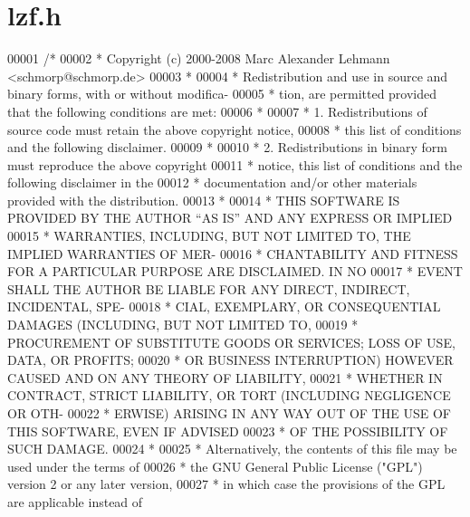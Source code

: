 \hypertarget{lzf_8h_source}{}\section{lzf.\+h}
\label{lzf_8h_source}

\begin{DoxyCode}
00001 \textcolor{comment}{/*}
00002 \textcolor{comment}{ * Copyright (c) 2000-2008 Marc Alexander Lehmann <schmorp@schmorp.de>}
00003 \textcolor{comment}{ *}
00004 \textcolor{comment}{ * Redistribution and use in source and binary forms, with or without modifica-}
00005 \textcolor{comment}{ * tion, are permitted provided that the following conditions are met:}
00006 \textcolor{comment}{ *}
00007 \textcolor{comment}{ *   1.  Redistributions of source code must retain the above copyright notice,}
00008 \textcolor{comment}{ *       this list of conditions and the following disclaimer.}
00009 \textcolor{comment}{ *}
00010 \textcolor{comment}{ *   2.  Redistributions in binary form must reproduce the above copyright}
00011 \textcolor{comment}{ *       notice, this list of conditions and the following disclaimer in the}
00012 \textcolor{comment}{ *       documentation and/or other materials provided with the distribution.}
00013 \textcolor{comment}{ *}
00014 \textcolor{comment}{ * THIS SOFTWARE IS PROVIDED BY THE AUTHOR ``AS IS'' AND ANY EXPRESS OR IMPLIED}
00015 \textcolor{comment}{ * WARRANTIES, INCLUDING, BUT NOT LIMITED TO, THE IMPLIED WARRANTIES OF MER-}
00016 \textcolor{comment}{ * CHANTABILITY AND FITNESS FOR A PARTICULAR PURPOSE ARE DISCLAIMED.  IN NO}
00017 \textcolor{comment}{ * EVENT SHALL THE AUTHOR BE LIABLE FOR ANY DIRECT, INDIRECT, INCIDENTAL, SPE-}
00018 \textcolor{comment}{ * CIAL, EXEMPLARY, OR CONSEQUENTIAL DAMAGES (INCLUDING, BUT NOT LIMITED TO,}
00019 \textcolor{comment}{ * PROCUREMENT OF SUBSTITUTE GOODS OR SERVICES; LOSS OF USE, DATA, OR PROFITS;}
00020 \textcolor{comment}{ * OR BUSINESS INTERRUPTION) HOWEVER CAUSED AND ON ANY THEORY OF LIABILITY,}
00021 \textcolor{comment}{ * WHETHER IN CONTRACT, STRICT LIABILITY, OR TORT (INCLUDING NEGLIGENCE OR OTH-}
00022 \textcolor{comment}{ * ERWISE) ARISING IN ANY WAY OUT OF THE USE OF THIS SOFTWARE, EVEN IF ADVISED}
00023 \textcolor{comment}{ * OF THE POSSIBILITY OF SUCH DAMAGE.}
00024 \textcolor{comment}{ *}
00025 \textcolor{comment}{ * Alternatively, the contents of this file may be used under the terms of}
00026 \textcolor{comment}{ * the GNU General Public License ("GPL") version 2 or any later version,}
00027 \textcolor{comment}{ * in which case the provisions of the GPL are applicable instead of}

\end{DoxyCode}
